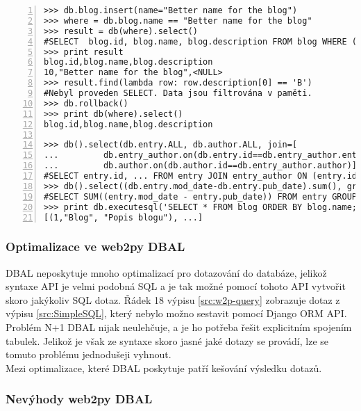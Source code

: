 \documentclass[ing,male,java,dept456]{diploma}						%
\begin{document}
\begin{lstlisting}[style=custompython, numbers=left, label=src:w2p-query, caption={Ukázka získávání dat z databáze ve web2py DBAL}]
>>> db.blog.insert(name="Better name for the blog")
>>> where = db.blog.name == "Better name for the blog"
>>> result = db(where).select()
#SELECT  blog.id, blog.name, blog.description FROM blog WHERE (blog.name = 'Better name for the blog'); 
>>> print result
blog.id,blog.name,blog.description
10,"Better name for the blog",<NULL>
>>> result.find(lambda row: row.description[0] == 'B')
#Nebyl proveden SELECT. Data jsou filtrována v paměti.
>>> db.rollback()
>>> print db(where).select()
blog.id,blog.name,blog.description

>>> db().select(db.entry.ALL, db.author.ALL, join=[
...			db.entry_author.on(db.entry.id==db.entry_author.entry),
...			db.author.on(db.author.id==db.entry_author.author)])
#SELECT entry.id, ... FROM entry JOIN entry_author ON (entry.id = entry_author.entry) JOIN author ON (author.id = entry_author.author) WHERE (entry.id IS NOT NULL);
>>> db().select((db.entry.mod_date-db.entry.pub_date).sum(), groupby=db.entry.blog_id)
#SELECT SUM((entry.mod_date - entry.pub_date)) FROM entry GROUP BY entry.blog_id;
>>> print db.executesql('SELECT * FROM blog ORDER BY blog.name;')
[(1,"Blog", "Popis blogu"), ...]
\end{lstlisting}

\subsubsection{Optimalizace ve web2py DBAL}
DBAL neposkytuje mnoho optimalizací pro dotazování do databáze, jelikož syntaxe API je velmi podobná SQL a je tak možné pomocí tohoto API vytvořit skoro jakýkoliv SQL dotaz. Řádek 18 výpisu \ref{src:w2p-query} zobrazuje dotaz z výpisu \ref{src:SimpleSQL}, který nebylo možno sestavit pomocí Django ORM API.  \\
Problém N+1 DBAL nijak neulehčuje, a je ho potřeba řešit explicitním spojením tabulek. Jelikož je však ze syntaxe skoro jasné jaké dotazy se provádí, lze se tomuto problému jednodušeji vyhnout. \\
Mezi optimalizace, které DBAL poskytuje patří kešování výsledku dotazů. \\

\subsubsection{Nevýhody web2py DBAL}
\label{subsubsec:web2py-cons}
\end{document}
